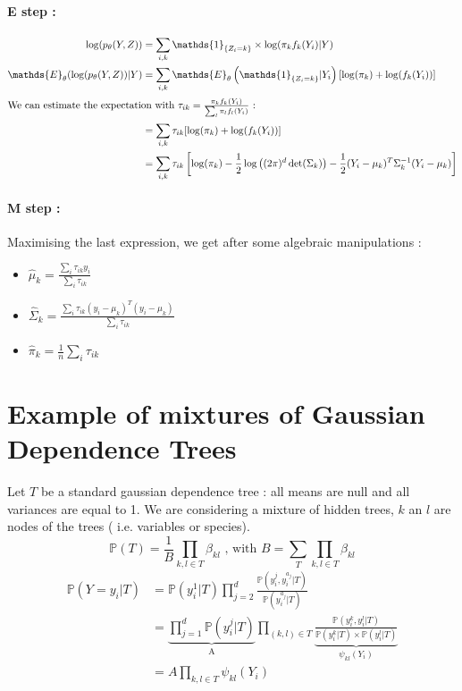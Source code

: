 \documentclass[a4paper,10pt]{article}
\begin{document}
\paragraph{E step :}



\begin{align*}
\log(p_\theta(Y,Z)) &= \sum_{i,k} \mathds{1}_{\{Z_i = k\}} \times \log(\pi_k f_k(Y_i)|Y)\\
\mathds{E}_\theta (\log(p_\theta(Y,Z))|Y)&= \sum_{i,k} \mathds{E}_\theta \left( \mathds{1}_{\{Z_i = k\}} |Y_i\right)[\log(\pi_k) + \log(f_k(Y_i)) ]\\
\intertext{We can estimate the expectation with $\tau_{ik} = \frac{\pi_k f_k(Y_i)}{\sum_{l} \pi_l f_l(Y_i)}$ :}
&= \sum_{i,k}\tau_{ik}[\log(\pi_k) + \log(f_k(Y_i)) ] \\
&= \sum_{i,k}\tau_{ik}\left[\log(\pi_k)-\frac{1}{2}\log\left((2\pi)^d\det(\Sigma_k)\right) - \frac{1}{2}(Y_i - \mu_k)^T\Sigma_k^{-1}(Y_i - \mu_k)\right] \\
\end{align*}


\paragraph{M step :}
Maximising the last expression, we get after some algebraic manipulations :
\begin{itemize}
\item \large{$\hat{\mu}_k = \frac{\sum_i \tau_{ik} y_i}{\sum_i \tau_{ik}}$}\normalsize
\item \large{$\hat{\Sigma}_k = \frac{\sum_i \tau_{ik} (y_i-\mu_k)^T(y_i-\mu_k)}{\sum_i \tau_{ik}}$}\normalsize
\item \large{$\hat{\pi}_k = \frac{1}{n} \sum_i \tau_{ik}$}
\end{itemize}

\section{Example of mixtures of Gaussian Dependence Trees}
Let $T$ be a standard gaussian dependence tree : all means are null and all variances are equal to 1. We are considering a mixture of hidden trees, $k$ an $l$  are nodes of the trees (
i.e. variables or species).\\

\[ \mathds{P}(T) = \frac{1}{B}\prod_{k,l\in T} \beta_{kl} \text{ , with } B = \sum_T \prod_{k,l\in T} \beta_{kl} \]
\begin{align*}
\mathds{P}(Y=y_i|T) &=\mathds{P}(y_i^1|T)\prod_{j=2}^d \frac{\mathds{P}(y_i^j,y_i^{a_j}|T)}{\mathds{P}(y_i^{a_j}|T)}\\
&=\underbrace{\prod_{j=1}^d \mathds{P}(y_i^j|T)}_{\text{A}}\prod_{(k,l)\in T} \underbrace{\frac{\mathds{P}(y_i^k,y_i^l|T)}{\mathds{P}(y_i^k|T)\times \mathds{P}(y_i^l|T)}}_{\psi_{kl}(Y_i)}\\
&=A\prod_{k,l \in T}\psi_{kl}(Y_i)
\end{align*}
\end{document}
